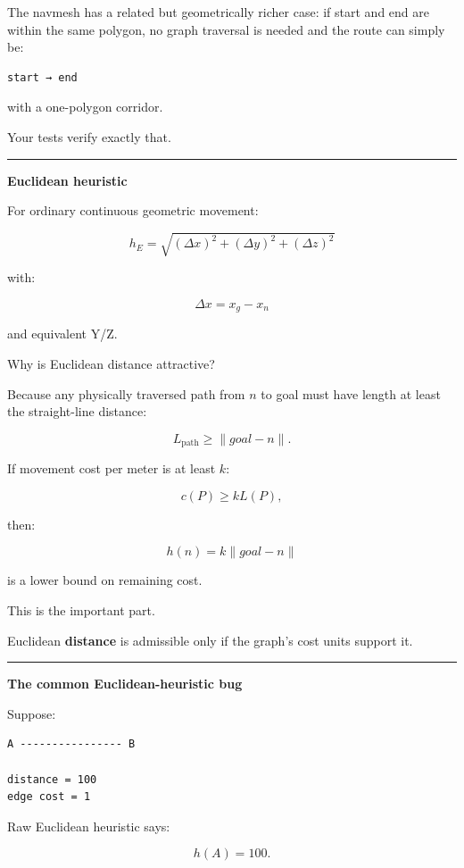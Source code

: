 The navmesh has a related but geometrically richer case: if start and end are within the same polygon, no graph traversal is needed and the route can simply be:

\begin{verbatim}
start → end
\end{verbatim}

with a one-polygon corridor.

Your tests verify exactly that.

\begin{center}\rule{0.5\linewidth}{0.5pt}\end{center}

\textbf{Euclidean heuristic}

For ordinary continuous geometric movement:

\[
\boxed{
h_E=
\sqrt{
(\Delta x)^2+
(\Delta y)^2+
(\Delta z)^2
}
}
\]

with:

\[
\Delta x=x_g-x_n
\]

and equivalent Y/Z.

Why is Euclidean distance attractive?

Because any physically traversed path from \(n\) to goal must have length at least the straight-line distance:

\[
L_{\text{path}}
\ge
\|goal-n\|.
\]

If movement cost per meter is at least \(k\):

\[
c(P)\ge kL(P),
\]

then:

\[
h(n)=k\|goal-n\|
\]

is a lower bound on remaining cost.

This is the important part.

Euclidean \textbf{distance} is admissible only if the graph's cost units support it.

\begin{center}\rule{0.5\linewidth}{0.5pt}\end{center}

\textbf{The common Euclidean-heuristic bug}

Suppose:

\begin{verbatim}
A ---------------- B

distance = 100
edge cost = 1
\end{verbatim}

Raw Euclidean heuristic says:

\[
h(A)=100.
\]

